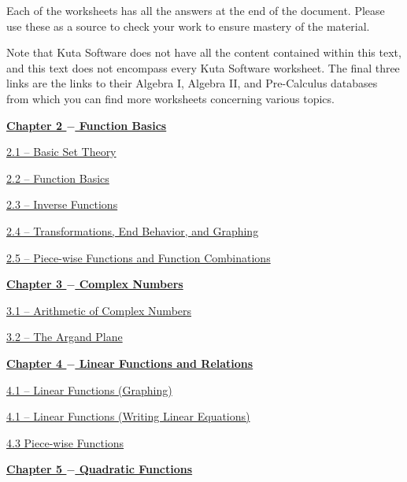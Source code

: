 \documentclass[lang=en,11pt]{elegantbook}
\begin{document}
Each of the worksheets has all the answers at the end of the document.  Please use these as a source to check your work to ensure mastery of the material.

Note that Kuta Software does not have all the content contained within this text, and this text does not encompass every Kuta Software worksheet.  The final three links are the links to their Algebra I, Algebra II, and Pre-Calculus databases from which you can find more worksheets concerning various topics.

\noindent \underline{\textbf{Chapter 2 $-$ Function Basics}}

\href{https://cdn.kutasoftware.com/Worksheets/Alg1/Number%20Sets.pdf}{2.1 – Basic Set Theory}

\href{https://www.leonschools.net/cms/lib7/FL01903265/Centricity/Domain/4838/Ch%202.1%20%20Functions%20Domain%20and%20Range%20Review%20WKSH%20PDF.pdf}{2.2 – Function Basics}

\href{https://cdn.kutasoftware.com/Worksheets/Precalc/01%20-%20Function%20Inverses.pdf}{2.3 – Inverse Functions}

\href{https://cdn.kutasoftware.com/Worksheets/Precalc/01%20-%20Transformations%20of%20Graphs.pdf}{2.4 – Transformations, End Behavior, and Graphing}

\href{https://cdn.kutasoftware.com/Worksheets/Precalc/01%20-%20Function%20Operations.pdf}{2.5 – Piece-wise Functions and Function Combinations}

\noindent \underline{\textbf{Chapter 3 $-$ Complex Numbers}}

\href{https://cdn.kutasoftware.com/Worksheets/Alg2/Operations%20with%20Complex%20Numbers.pdf}{3.1 – Arithmetic of Complex Numbers}

\href{https://cdn.kutasoftware.com/Worksheets/Alg2/Properties%20of%20Complex%20Numbers.pdf}{3.2 – The Argand Plane}

\noindent \underline{\textbf{Chapter 4 $-$ Linear Functions and Relations}}

\href{https://cdn.kutasoftware.com/Worksheets/Alg1/Graphing%20Lines%20SF.pdf}{4.1 – Linear Functions (Graphing)}

\href{https://cdn.kutasoftware.com/Worksheets/Alg1/Writing%20Linear%20Equations.pdf}{4.1 – Linear Functions (Writing Linear Equations)}

\href{https://cdn.kutasoftware.com/Worksheets/Precalc/01%20-%20Piecewise%20Functions.pdf}{4.3   Piece-wise Functions}

\noindent \underline{\textbf{Chapter 5 $-$ Quadratic Functions}}
\end{document}
